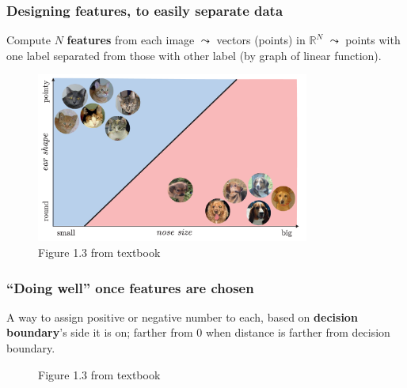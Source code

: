 \documentclass{beamer}
\theoremstyle{example}
\newcommand{\bb}[1]{\mathbb{#1}}
\begin{document}
\begin{frame}
    \frametitle{Designing features, to easily separate data}
    Compute $N$ \textbf{features} from each image $\leadsto$ vectors (points) in $\bb R^N$ $\leadsto$ points with one label separated from those with other label (by graph of linear function).

    \begin{figure}
        \includegraphics[width=0.8\textwidth]{../../Images/Fig1-3.png}
    \caption*{Figure 1.3 from textbook}
    \end{figure}
\end{frame}

\begin{frame}
    \frametitle{``Doing well'' once features are chosen}
    A way to assign positive or negative number to each, based on \textbf{decision boundary}'s side it is on; farther from 0 when distance is farther from decision boundary.
    
    \pause
    \begin{figure}
    \caption*{Figure 1.3 from textbook}
    \end{figure}
\end{frame}
\end{document}
